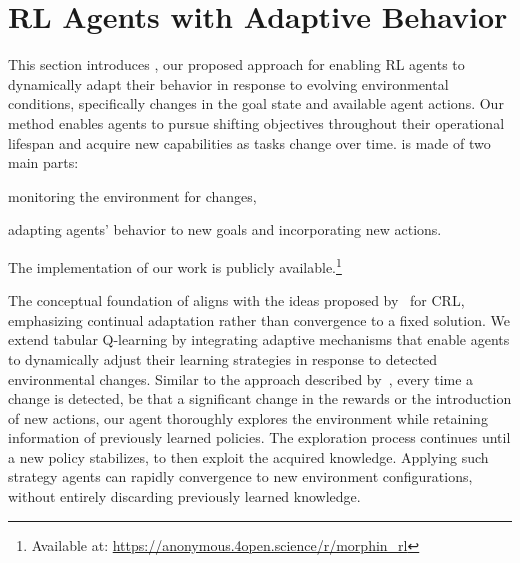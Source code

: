

\section{\ac{RL} Agents with Adaptive Behavior}
\label{sec:implementation}

This section introduces \adaptiverl, our proposed approach for enabling \ac{RL} agents to 
dynamically adapt their behavior in response to evolving environmental conditions, specifically 
changes in the goal state and available agent actions. Our method enables agents to 
pursue shifting objectives throughout their operational lifespan and acquire new capabilities as 
tasks change over time. \adaptiverl is made of two main parts:
\begin{enumerate*}[label=(\arabic*)]
\item monitoring the environment for changes,
\item adapting agents' behavior to new goals and incorporating new actions.
\end{enumerate*}
The implementation of our work is publicly available.\footnote{Available at: \url{https://anonymous.4open.science/r/morphin_rl}}

The conceptual foundation of \adaptiverl aligns with the ideas proposed 
by~\citet{abel2023definitioncontinualreinforcementlearning} for \ac{CRL}, emphasizing continual 
adaptation rather than convergence to a fixed solution. We extend tabular Q-learning by integrating 
adaptive mechanisms that enable agents to dynamically adjust their learning strategies in response 
to detected environmental changes. Similar to the approach described 
by~\citet{norman2024firstexploreexploitmetalearningsolve}, every time a change is detected, be that 
a significant change in the rewards or the introduction of new actions, our agent thoroughly explores 
the environment while retaining information of previously learned policies. The exploration process 
continues until a new policy stabilizes, to then exploit the acquired knowledge. Applying such 
strategy agents can rapidly convergence to new environment configurations, without entirely 
discarding previously learned knowledge.

